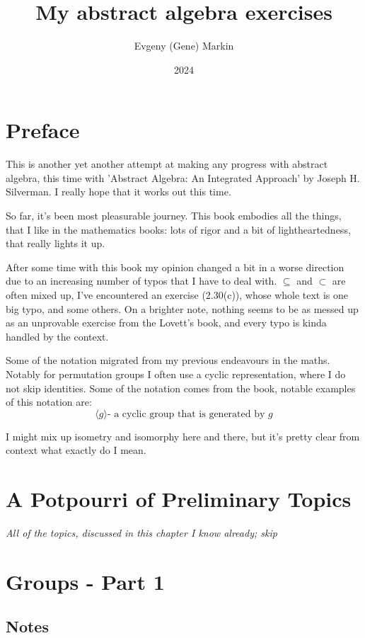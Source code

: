 \documentclass[11pt,oneside,titlepage]{book}
\title{My abstract algebra exercises}
\author{Evgeny (Gene) Markin}
\date{2024}
\newcommand{\eangle}[1]{\langle #1 \rangle}
\begin{document}
\maketitle
\tableofcontents

\chapter*{Preface}

This is another yet another attempt at making any progress with
abstract algebra, this time with 'Abstract Algebra: An Integrated
Approach' by Joseph H. Silverman. I really hope that it works out this
time.

So far, it's been most pleasurable journey. This book embodies all the
things, that I like in the mathematics books: lots of rigor and a bit of
lightheartedness, that really lights it up.

After some time with this book my opinion changed a bit in a worse
direction due to an increasing number of typos that I have to deal
with. $\subseteq$ and $\subset$ are often mixed up, I've encountered
an exercise (2.30(c)), whose whole text is one big typo, and some
others. On a brighter note, nothing seems to be as messed up as an
unprovable exercise from the Lovett's book, and every typo is kinda
handled by the context.

Some of the notation migrated from my previous endeavours in the
maths. Notably for permutation groups I often use a cyclic
representation, where I do not skip identities.
Some of the notation comes from the book, notable examples of
this notation are:
$$\eangle{g} \text{- a cyclic group that is generated by }g$$

I might mix up isometry and isomorphy here and there, but it's
pretty clear from context what exactly do I mean.


\chapter{A Potpourri of Preliminary Topics}

\textit{All of the topics, discussed in this chapter I know already; skip}

\chapter{Groups - Part 1}

\section*{Notes}
\end{document}
